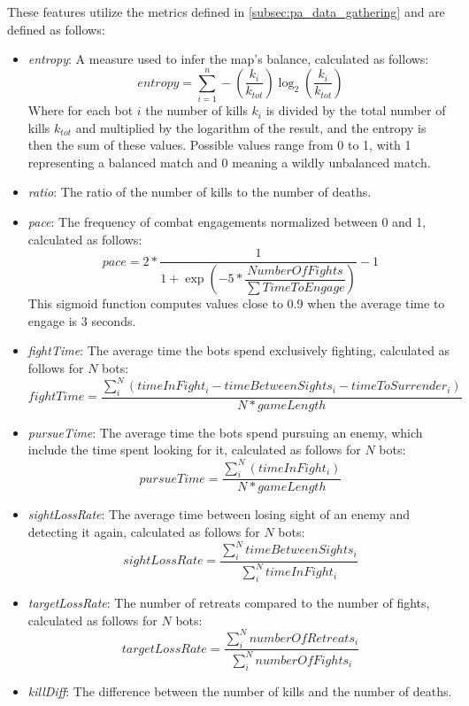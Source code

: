 These features utilize the metrics defined in \cref{subsec:pa_data_gathering} and are defined as follows:
\begin{itemize}
    \item \textit{entropy}: A measure used to infer the map's balance, calculated as follows:
    \begin{equation}
        entropy = \sum_{i=1}^{n} - \left(\dfrac{k_i}{k_{tot}}\right) \log_2 \left(\dfrac{k_i}{k_{tot}}\right)
    \end{equation}
    Where for each bot $i$ the number of kills $k_i$ is divided by the total number of kills $k_{tot}$ and multiplied by the logarithm of the result, and the entropy is then the sum of these values. Possible values range from 0 to 1, with 1 representing a balanced match and 0 meaning a wildly unbalanced match.
    \item \textit{ratio}: The ratio of the number of kills to the number of deaths.
    \item \textit{pace}: The frequency of combat engagements normalized between 0 and 1, calculated as follows:
    \begin{equation}
        pace = 2 * \dfrac{1}{1 + \exp \left(-5 * \dfrac{NumberOfFights}{\sum TimeToEngage}\right)} - 1
    \end{equation}
    This sigmoid function computes values close to 0.9 when the average time to engage is 3 seconds.
    \item \textit{fightTime}: The average time the bots spend exclusively fighting, calculated as follows for $N$ bots:
    \begin{equation}
        fightTime = \dfrac{  \sum_{i}^{N} \left(timeInFight_i - timeBetweenSights_i - timeToSurrender_i\right) }{ N * gameLength}
    \end{equation}
    \item \textit{pursueTime}: The average time the bots spend pursuing an enemy, which include the time spent looking for it, calculated as follows for $N$ bots:
    \begin{equation}
        pursueTime = \dfrac{  \sum_{i}^{N} \left(timeInFight_i\right) }{ N * gameLength}
    \end{equation}
    \item \textit{sightLossRate}: The average time between losing sight of an enemy and detecting it again, calculated as follows for $N$ bots:
    \begin{equation}
        sightLossRate = \dfrac{  \sum_{i}^{N} timeBetweenSights_i }{ \sum_{i}^{N} timeInFight_i}
    \end{equation}
    \item \textit{targetLossRate}: The number of retreats compared to the number of fights, calculated as follows for $N$ bots:
    \begin{equation}
        targetLossRate = \dfrac{  \sum_{i}^{N} numberOfRetreats_i }{ \sum_{i}^{N} numberOfFights_i}
    \end{equation}
    \item \textit{killDiff}: The difference between the number of kills and the number of deaths.
\end{itemize}

